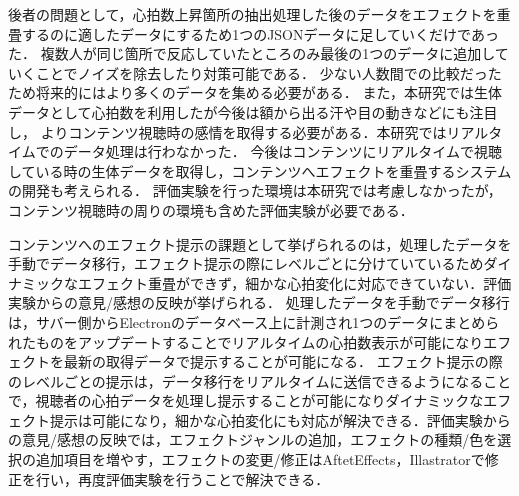 後者の問題として，心拍数上昇箇所の抽出処理した後のデータをエフェクトを重畳するのに適したデータにするため1つのJSONデータに足していくだけであった．
複数人が同じ箇所で反応していたところのみ最後の1つのデータに追加していくことでノイズを除去したり対策可能である．
少ない人数間での比較だったため将来的にはより多くのデータを集める必要がある．
また，本研究では生体データとして心拍数を利用したが今後は額から出る汗や目の動きなどにも注目し，
よりコンテンツ視聴時の感情を取得する必要がある．本研究ではリアルタイムでのデータ処理は行わなかった．
今後はコンテンツにリアルタイムで視聴している時の生体データを取得し，コンテンツへエフェクトを重畳するシステムの開発も考えられる．
評価実験を行った環境は本研究では考慮しなかったが，コンテンツ視聴時の周りの環境も含めた評価実験が必要である．

コンテンツへのエフェクト提示の課題として挙げられるのは，処理したデータを手動でデータ移行，エフェクト提示の際にレベルごとに分けていているためダイナミックなエフェクト重畳ができず，細かな心拍変化に対応できていない．評価実験からの意見/感想の反映が挙げられる．
処理したデータを手動でデータ移行は，サバー側からElectronのデータベース上に計測され1つのデータにまとめられたものをアップデートすることでリアルタイムの心拍数表示が可能になりエフェクトを最新の取得データで提示することが可能になる．
エフェクト提示の際のレベルごとの提示は，データ移行をリアルタイムに送信できるようになることで，視聴者の心拍データを処理し提示することが可能になりダイナミックなエフェクト提示は可能になり，細かな心拍変化にも対応が解決できる．評価実験からの意見/感想の反映では，エフェクトジャンルの追加，エフェクトの種類/色を選択の追加項目を増やす，エフェクトの変更/修正はAftetEffects，Illastratorで修正を行い，再度評価実験を行うことで解決できる．


